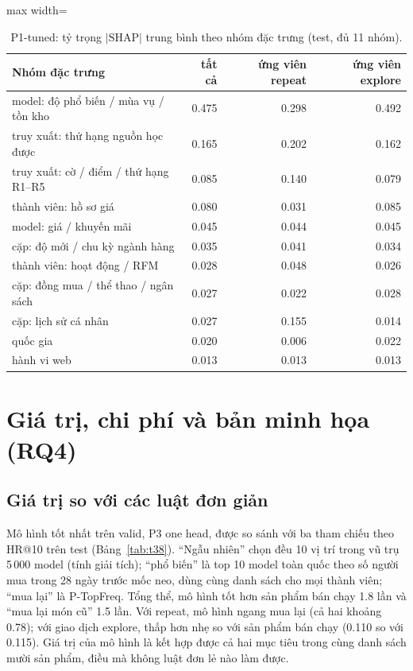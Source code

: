 \documentclass[jtehm]{ieeeaccess}
\begin{document}
\begin{table}[t]
\caption{P1-tuned: tỷ trọng $|\mathrm{SHAP}|$ trung bình theo nhóm đặc trưng (test, đủ 11 nhóm).}
\label{tab:shap}
\setlength{\tabcolsep}{3pt}
\centering
\begin{adjustbox}{max width=\columnwidth}
\begin{tabular}{lrrr}
\toprule
Nhóm đặc trưng & tất cả & ứng viên repeat & ứng viên explore \\
\midrule
model: độ phổ biến / mùa vụ / tồn kho      & 0.475 & 0.298 & 0.492 \\
truy xuất: thứ hạng nguồn học được         & 0.165 & 0.202 & 0.162 \\
truy xuất: cờ / điểm / thứ hạng R1--R5 & 0.085 & 0.140 & 0.079 \\
thành viên: hồ sơ giá                   & 0.080 & 0.031 & 0.085 \\
model: giá / khuyến mãi                    & 0.045 & 0.044 & 0.045 \\
cặp: độ mới / chu kỳ ngành hàng        & 0.035 & 0.041 & 0.034 \\
thành viên: hoạt động / RFM                  & 0.028 & 0.048 & 0.026 \\
cặp: đồng mua / thể thao / ngân sách      & 0.027 & 0.022 & 0.028 \\
cặp: lịch sử cá nhân                       & 0.027 & 0.155 & 0.014 \\
quốc gia                                & 0.020 & 0.006 & 0.022 \\
hành vi web                             & 0.013 & 0.013 & 0.013 \\
\bottomrule
\end{tabular}
\end{adjustbox}
\end{table}

\section{Giá trị, chi phí và bản minh họa (RQ4)}
\label{sec:feasibility}

\subsection{Giá trị so với các luật đơn giản}
Mô hình tốt nhất trên valid, P3 one head, được so sánh với ba tham chiếu theo HR@10 trên test (Bảng~\ref{tab:t38}). ``Ngẫu nhiên'' chọn đều 10 vị trí trong vũ trụ 5\,000 model (tính giải tích); ``phổ biến'' là top 10 model toàn quốc theo số người mua trong 28 ngày trước mốc neo, dùng cùng danh sách cho mọi thành viên; ``mua lại'' là P-TopFreq. Tổng thể, mô hình tốt hơn sản phẩm bán chạy 1.8 lần và ``mua lại món cũ'' 1.5 lần. Với repeat, mô hình ngang mua lại (cả hai khoảng 0.78); với giao dịch explore, thấp hơn nhẹ so với sản phẩm bán chạy (0.110 so với 0.115). Giá trị của mô hình là kết hợp được cả hai mục tiêu trong cùng danh sách mười sản phẩm, điều mà không luật đơn lẻ nào làm được.
\end{document}

